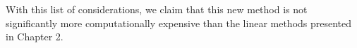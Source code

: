 With this list of considerations, we claim that this new method is not significantly more computationally expensive than the linear methods presented in Chapter 2.
%
%

